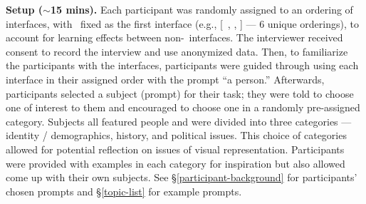 \textbf{Setup ($\sim$15 mins).}
Each participant was randomly assigned to an ordering of interfaces, with \baseline~fixed as the first interface (e.g., [\baseline~\agonistic, \diverse, ] --- 6 unique orderings), to account for learning effects between non-\baseline~interfaces.
The interviewer received consent to record the interview and use anonymized data.
Then, to familiarize the participants with the interfaces, participants were guided through using each interface in their assigned order with the prompt ``a person.''
Afterwards, participants selected a subject (prompt) for their task; they were told to choose one of interest to them and encouraged to choose one in a randomly pre-assigned category.
Subjects all featured people and were divided into three categories --- identity  / demographics, history, and political issues. 
This choice of categories allowed for potential reflection on issues of visual representation.
Participants were provided with examples in each category for inspiration but also allowed come up with their own subjects. 
See \S\ref{participant-background} for participants' chosen prompts and \S\ref{topic-list} for example prompts.

